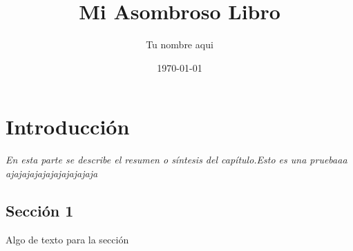 \documentclass[]{book}
\title{\bf Mi Asombroso Libro}
\author{Tu nombre aqui}
\date{\today}
\begin{document}
\frontmatter
\maketitle
\tableofcontents
\mainmatter
\chapter{Introducción}
\begin{center}
\textit{En esta parte se describe el resumen o síntesis
del capítulo.Esto es una pruebaaa ajajajajajajajajajajaja}
\end{center}
\section{Sección 1}
Algo de texto para la sección
\end{document}
